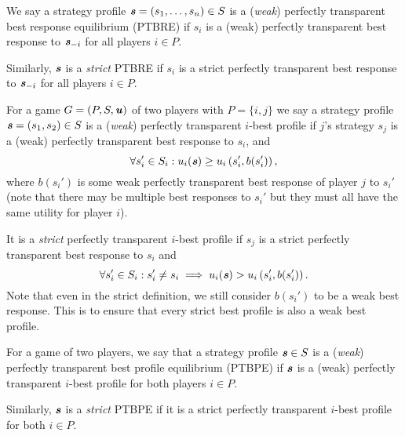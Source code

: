 \begin{definition}
	We say a strategy profile $\boldsymbol{\mathit{s}} = (s_1, \dots, s_n) \in S$ is a (\textit{weak}) perfectly transparent best response equilibrium (PTBRE) if $s_i$ is a (weak) perfectly transparent best response to $\boldsymbol{\mathit{s}}_{-i}$ for all players $i \in P$.
	
	Similarly, $\boldsymbol{\mathit{s}}$ is a \textit{strict} PTBRE if $s_i$ is a strict perfectly transparent best response to $\boldsymbol{\mathit{s}}_{-i}$ for all players $i \in P$.
\end{definition}

\begin{definition}
	For a game $G = (P, S, \boldsymbol{\mathit{u}})$ of two players with $P = \{i, j\}$
	we say a strategy profile $\boldsymbol{\mathit{s}} = (s_1, s_2) \in S$ is a (\textit{weak}) perfectly transparent $i$-best profile if
	$j$'s strategy $s_j$ is a (weak) perfectly transparent best response to $s_i$, and
	\[
		\forall s_i' \in S_i: u_i(\boldsymbol{\mathit{s}}) \ge u_i\left(s_i', b(s_i')\right),
	\]
	where $b(s_i')$ is some weak perfectly transparent best response of player $j$ to $s_i'$ (note that there may be multiple best responses to $s_i'$ but they must all have the same utility for player $i$).

	It is a \textit{strict} perfectly transparent $i$-best profile if $s_j$ is a strict perfectly transparent best response to $s_i$ and
	\[
		\forall s_i' \in S_i: s_i' \ne s_i \implies u_i(\boldsymbol{\mathit{s}}) > u_i\left(s_i', b(s_i')\right).
	\]
	Note that even in the strict definition, we still consider $b(s_i')$ to be a weak best response.
	This is to ensure that every strict best profile is also a weak best profile.
\end{definition}

\begin{definition}
	For a game of two players, we say that a strategy profile $\boldsymbol{\mathit{s}} \in S$ is a (\textit{weak}) perfectly transparent best profile equilibrium (PTBPE) if $\boldsymbol{\mathit{s}}$ is a (weak) perfectly transparent $i$-best profile for both players $i \in P$.

	Similarly, $\boldsymbol{\mathit{s}}$ is a \textit{strict} PTBPE if it is a strict perfectly transparent $i$-best profile for both $i \in P$.
\end{definition}

